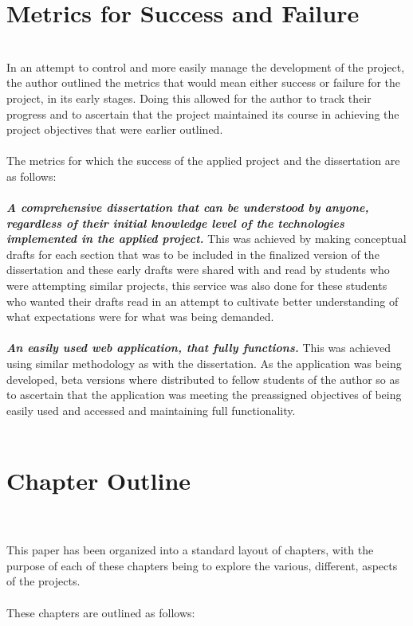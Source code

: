 \section{Metrics for Success and Failure} \\
In an attempt to control and more easily manage the development of the project, the author outlined the metrics that would mean either success or failure for the project, in its early stages. Doing this allowed for the author to track their progress and to ascertain that the project maintained its course in achieving the project objectives that were earlier outlined. \\ \\
The metrics for which the success of the applied project and the dissertation are as follows: \\ \\
\textbf{\emph{A comprehensive dissertation that can be understood by anyone,  regardless of their initial knowledge level of the technologies implemented in the applied project.}} This was achieved by making conceptual drafts for each section that was to be included in the finalized version of the dissertation and these early drafts were shared with and read by students who were attempting similar projects, this service was also done for these students who wanted their drafts read in an attempt to cultivate better understanding of what expectations were for what was being demanded. \\ \\
\textbf{\emph{An easily used web application, that fully functions.}} This was achieved using similar methodology as with the dissertation. As the application was being developed, beta versions where distributed to fellow students of the author so as to ascertain that the application was meeting the preassigned objectives of being easily used and accessed and maintaining full functionality. \\ \\

\section{Chapter Outline} \\ \\
This paper has been organized into a standard layout of chapters, with the purpose of each of these chapters being to explore the various, different, aspects of the projects. \\ \\
These chapters are outlined as follows: \\ 
